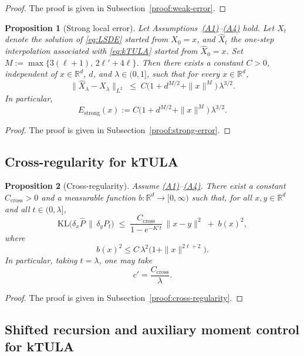 \documentclass[11pt,a4paper,reqno]{amsart}
\theoremstyle{plain}
\newtheorem{proposition}{Proposition}
\theoremstyle{definition}
\theoremstyle{remark}
\newcommand{\R}{\mathbb{R}}
\newcommand{\KL}{\mathrm{KL}}
\begin{document}
\begin{proof}
The proof is given in Subsection~\ref{proof:weak-error}.
\end{proof}


\begin{proposition}[Strong local error]
\label{prop:strong-error-app}
Let Assumptions~\hyperref[ass:PJG]{\textup{(A1)}}--\hyperref[ass:D]{\textup{(A4)}} hold.
Let \(X_t\) denote the solution of \eqref{eq:LSDE} started from \(X_0=x\), and
\(\widehat X_t\) the one-step interpolation associated with \eqref{eq:kTULA} started from \(\widehat X_0=x\).
Set \(M := \max\{3(\ell+1),\,2\ell'+4\ell\}\).
Then there exists a constant \(C>0\), independent of \(x\in\R^d\), \(d\), and \(\lambda\in(0,1]\), such that for every \(x\in\R^d\),
\[
  \|\widehat X_\lambda - X_\lambda\|_{L^2}
  \;\le\;
  C\bigl(1+d^{M/2}+\|x\|^{M}\bigr)\,\lambda^{3/2}.
\]
In particular,
\[
  E_{\mathrm{strong}}(x)
  :=
  C\bigl(1+d^{M/2}+\|x\|^{M}\bigr)\,\lambda^{3/2}.
\]
\end{proposition}

\begin{proof}
The proof is given in Subsection~\ref{proof:strong-error}.
\end{proof}


\subsection{Cross-regularity for kTULA}

\begin{proposition}[Cross-regularity]
\label{prop:cross-regularity-app}
Assume \hyperref[ass:PJG]{\textup{(A1)}}--\hyperref[ass:D]{\textup{(A4)}}. There exist a constant \(C_{\mathrm{cross}}>0\) and a measurable function
\(b:\R^d\to[0,\infty)\) such that, for all \(x,y\in\R^d\) and all \(t\in(0,\lambda]\),
\[
  \KL\!\bigl(\delta_x \widehat P \,\big\|\, \delta_y P_t\bigr)
  \;\le\;
  \frac{C_{\mathrm{cross}}}{1-e^{-K't}}\,\|x-y\|^2
  \;+\;
  b(x)^2,
\]
where
\[
  b(x)^2 \le C\,\lambda^2\bigl(1+\|x\|^{2\ell+2}\bigr).
\]
In particular, taking \(t=\lambda\), one may take
\[
  c'=\frac{C_{\mathrm{cross}}}{\lambda}.
\]
\end{proposition}

\begin{proof}
The proof is given in Subsection~\ref{proof:cross-regularity}.
\end{proof}

\subsection{Shifted recursion and auxiliary moment control for kTULA}
\end{document}

